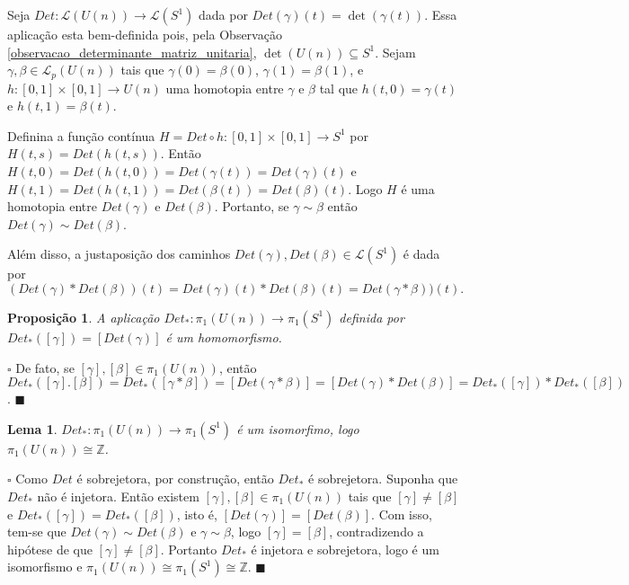\documentclass[12pt]{book}
\newtheorem{lema}[teorema]{Lema}
\newtheorem{proposicao}[teorema]{Proposição}
\newenvironment{prova}[1]{$\square$ #1}{\hfill$\blacksquare$}
\newcommand{\caminhos}{\mathcal{L}}
\newcommand{\caminhossempontobase}[1]{\caminhos(#1)}
\newcommand{\caminhospontobasegeral}[2]{\caminhos_{#1}(#2)}
\newcommand{\circulo}{S^{1}}
\newcommand{\classe}[1]{[#1]}
\newcommand{\grupofundamental}[1]{\pi_{1}(#1)}
\newcommand{\inteiros}{\mathbb{Z}}
\newcommand{\intervalo}{[0,1]}
\newcommand{\matrizunitaria}[1]{U(#1)}
\begin{document}
	Seja $Det:\caminhossempontobase{\matrizunitaria{n}} \to \caminhossempontobase{\circulo}$ dada por $Det(\gamma)(t) = \det(\gamma(t))$. Essa aplicação esta bem-definida pois, pela Observação \ref{observacao_determinante_matriz_unitaria}, $\det(\matrizunitaria{n}) \subseteq \circulo$. Sejam $\gamma, \beta \in\caminhospontobasegeral{p}{\matrizunitaria{n}} $ tais que $\gamma(0)=\beta(0)$, $\gamma(1)=\beta(1)$, e $h : \intervalo \times \intervalo \to \matrizunitaria{n}$ uma homotopia entre $\gamma$ e $\beta$ tal que $h(t,0) = \gamma(t)$ e $h(t,1)=\beta(t)$.
	
	Definina a função contínua $H = Det \circ h:\intervalo \times \intervalo \to \circulo$ por $H(t,s) = Det(h(t,s))$. Então $H(t,0) = Det(h(t,0)) = Det(\gamma(t)) = Det(\gamma)(t)$ e $H(t,1) = Det(h(t,1)) = Det(\beta(t)) = Det(\beta)(t)$. Logo $H$ é uma homotopia entre $Det(\gamma)$ e $Det(\beta)$. Portanto, se $\gamma \sim \beta$ então $Det(\gamma) \sim Det(\beta)$.
	
	Além disso, a justaposição dos caminhos $Det(\gamma),Det(\beta) \in \caminhossempontobase{\circulo}$ é dada por
	$$
	(Det(\gamma)*Det(\beta)) (t)= Det(\gamma)(t)*Det(\beta) (t) = Det(\gamma*\beta)) (t).
	$$

	\begin{proposicao}\label{proposicao_aplicacao_det_homomorfismo}
		A aplicação $Det_{*}: \grupofundamental{\matrizunitaria{n}} \to \grupofundamental{\circulo}$ definida por $Det_{*}(\classe{\gamma}) = \classe{Det(\gamma)}$ é um homomorfismo.
	\end{proposicao}	
	\begin{prova}
		De fato, se $\classe{\gamma}, \classe{\beta} \in \grupofundamental{\matrizunitaria{n}}$, então $Det_{*}(\classe{\gamma}.\classe{\beta}) = Det_{*}(\classe{\gamma *\beta}) =\classe{Det(\gamma *\beta)} = \classe{Det(\gamma) *Det(\beta)} = Det_{*}(\classe{\gamma})*Det_{*}(\classe{\beta})$.
	\end{prova}
	\begin{lema}\label{lema_isomorfismo_grupo_fundamental_Un}
		$Det_{*}: \grupofundamental{\matrizunitaria{n}} \to \grupofundamental{\circulo}$ é um isomorfimo, logo $\grupofundamental{\matrizunitaria{n}} \cong \inteiros$.
	\end{lema}
	\begin{prova}
		Como $Det$ é sobrejetora, por construção, então $Det_{*}$ é sobrejetora. Suponha que $Det_{*}$ não é injetora. Então existem $\classe{\gamma} , \classe{\beta} \in \grupofundamental{\matrizunitaria{n}}$ tais que $\classe{\gamma} \neq \classe{\beta}$ e $Det_{*}(\classe{\gamma})= Det_{*}(\classe{\beta} )$, isto é, $\classe{Det(\gamma)}= \classe{Det(\beta)}$. Com isso, tem-se que $Det(\gamma) \sim Det(\beta)$ e $\gamma \sim \beta$, logo $\classe{\gamma} = \classe{\beta}$, contradizendo a hipótese de que $\classe{\gamma} \neq \classe{\beta}$. Portanto $Det_{*}$ é injetora e sobrejetora, logo é um isomorfismo e $\grupofundamental{\matrizunitaria{n}} \cong \grupofundamental{\circulo} \cong \inteiros$.
	\end{prova}
	
\end{document}
